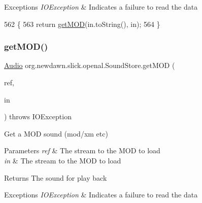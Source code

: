 \begin{DoxyExceptions}{Exceptions}
{\em I\+O\+Exception} & Indicates a failure to read the data \\
\hline
\end{DoxyExceptions}

\begin{DoxyCode}
562                                                            \{
563         \textcolor{keywordflow}{return} \mbox{\hyperlink{classorg_1_1newdawn_1_1slick_1_1openal_1_1_sound_store_a246badbe8459ae466b1e1b41e838c3f5}{getMOD}}(in.toString(), in);
564     \}
\end{DoxyCode}
\mbox{\label{classorg_1_1newdawn_1_1slick_1_1openal_1_1_sound_store_aeabf139bfb917fda7b01bdf2691ae3e9}} 
\subsubsection{\texorpdfstring{get\+M\+O\+D()}{getMOD()}\hspace{0.1cm}{\footnotesize\ttfamily [3/3]}}
{\footnotesize\ttfamily \mbox{\hyperlink{interfaceorg_1_1newdawn_1_1slick_1_1openal_1_1_audio}{Audio}} org.\+newdawn.\+slick.\+openal.\+Sound\+Store.\+get\+M\+OD (\begin{DoxyParamCaption}\item[{String}]{ref,  }\item[{Input\+Stream}]{in }\end{DoxyParamCaption}) throws I\+O\+Exception\hspace{0.3cm}{\ttfamily [inline]}}

Get a M\+OD sound (mod/xm etc)


\begin{DoxyParams}{Parameters}
{\em ref} & The stream to the M\+OD to load \\
\hline
{\em in} & The stream to the M\+OD to load \\
\hline
\end{DoxyParams}
\begin{DoxyReturn}{Returns}
The sound for play back 
\end{DoxyReturn}

\begin{DoxyExceptions}{Exceptions}
{\em I\+O\+Exception} & Indicates a failure to read the data \\
\hline
\end{DoxyExceptions}

